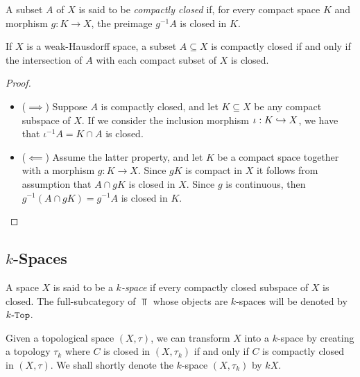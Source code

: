 \begin{definition}
    \label{def:compactly-closed}
    A subset \(A\) of \(X\) is said to be \emph{compactly closed} if, for every
    compact space \(K\) and morphism \(g: K \to X\), the preimage \(g^{-1} A\) is
    closed in \(K\).
\end{definition}

\begin{proposition}
    \label{prop:compactly-closed-in-weak-hausdorff-space}
    If \(X\) is a weak-Hausdorff space, a subset \(A \subseteq X\) is compactly
    closed if and only if the intersection of \(A\) with each compact subset of
    \(X\) is closed.
\end{proposition}

\begin{proof}
    \begin{itemize}\setlength\itemsep{0em}
        \item (\(\implies\)) Suppose \(A\) is compactly closed, and let
              \(K \subseteq X\) be any compact subspace of \(X\). If we consider the
              inclusion morphism \(\iota: K \hookrightarrow X\), we have that
              \(\iota^{-1} A = K \cap A\) is closed.

        \item (\(\impliedby\)) Assume the latter property, and let \(K\) be a compact
              space together with a morphism \(g: K \to X\). Since \(g K\) is compact in
              \(X\) it follows from assumption that \(A \cap g K\) is closed in \(X\). Since
              \(g\) is continuous, then \(g^{-1}(A \cap g K) = g^{-1} A\) is closed in
              \(K\).
    \end{itemize}
\end{proof}

\subsection{\texorpdfstring{\(k\)}{k}-Spaces}

\begin{definition}[\(k\)-space]
    \label{def:k-space}
    A space \(X\) is said to be a \emph{\(k\)-space} if every compactly closed
    subspace of \(X\) is closed. The full-subcategory of \(\Top\) whose objects are
    \(k\)-spaces will be denoted by \({k\text{-}\texttt{Top}}\).
\end{definition}

\begin{lemma}[\(k\)-ification]
    \label{lem:k-ification}
    Given a topological space \((X, \tau)\), we can transform \(X\) into a
    \(k\)-space by creating a topology \(\tau_k\) where \(C\) is closed in
    \((X, \tau_k)\) if and only if \(C\) is compactly closed in \((X, \tau)\). We
    shall shortly denote the \(k\)-space \((X, \tau_k)\) by \(kX\).
\end{lemma}

